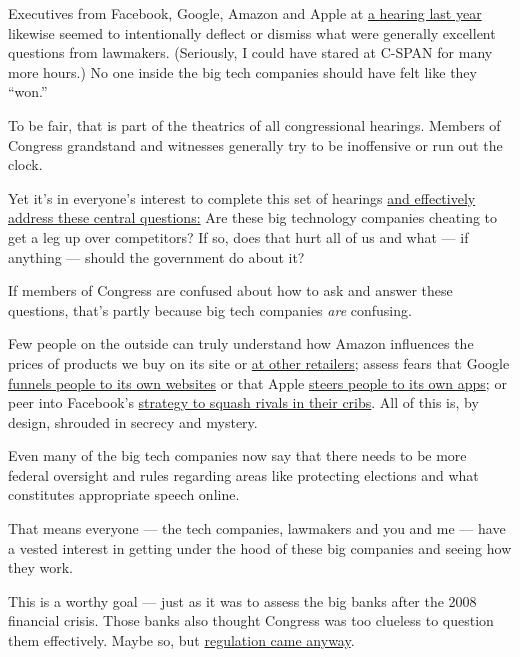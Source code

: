 Executives from Facebook, Google, Amazon and Apple at
\href{https://www.nytimes3xbfgragh.onion/2019/07/16/technology/big-tech-antitrust-hearing.html}{a
hearing last year} likewise seemed to intentionally deflect or dismiss
what were generally excellent questions from lawmakers. (Seriously, I
could have stared at C-SPAN for many more hours.) No one inside the big
tech companies should have felt like they ``won.''

To be fair, that is part of the theatrics of all congressional hearings.
Members of Congress grandstand and witnesses generally try to be
inoffensive or run out the clock.

Yet it's in everyone's interest to complete this set of hearings
\href{https://www.nytimes3xbfgragh.onion/2020/05/22/technology/google-antitrust.html}{and
effectively address these central questions:} Are these big technology
companies cheating to get a leg up over competitors? If so, does that
hurt all of us and what --- if anything --- should the government do
about it?

If members of Congress are confused about how to ask and answer these
questions, that's partly because big tech companies \emph{are}
confusing.

Few people on the outside can truly understand how Amazon influences the
prices of products we buy on its site or
\href{https://www.bloomberg.com/news/articles/2019-08-05/amazon-is-squeezing-sellers-that-offer-better-prices-on-walmart}{at
other retailers}; assess fears that Google
\href{https://themarkup.org/google-the-giant/2020/07/28/google-search-results-prioritize-google-products-over-competitors}{funnels
people to its own websites} or that Apple
\href{https://www.nytimes3xbfgragh.onion/interactive/2019/09/09/technology/apple-app-store-competition.html}{steers
people to its own apps}; or peer into Facebook's
\href{https://www.nytimes3xbfgragh.onion/2018/12/05/technology/facebook-emails-privacy-data.html}{strategy
to squash rivals in their cribs}. All of this is, by design, shrouded in
secrecy and mystery.

Even many of the big tech companies now say that there needs to be more
federal oversight and rules regarding areas like protecting elections
and what constitutes appropriate speech online.

That means everyone --- the tech companies, lawmakers and you and me ---
have a vested interest in getting under the hood of these big companies
and seeing how they work.

This is a worthy goal --- just as it was to assess the big banks after
the 2008 financial crisis. Those banks also thought Congress was too
clueless to question them effectively. Maybe so, but
\href{https://www.nytimes3xbfgragh.onion/2010/07/16/business/16regulate.html}{regulation
came anyway}.

